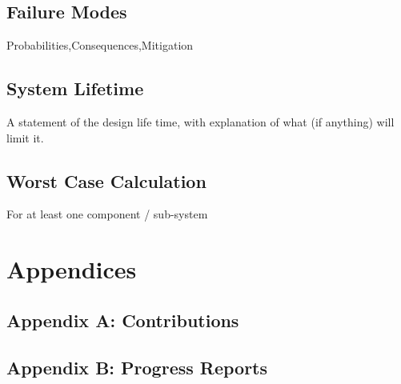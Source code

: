 \subsection{Failure Modes}
Probabilities,Consequences,Mitigation
\subsection{System Lifetime}
A statement of the design life time, with explanation of what (if anything) will limit it.
\subsection{Worst Case Calculation}
For at least one component / sub-system 



\newpage





\newpage
\section*{Appendices}
\subsection*{Appendix A: Contributions}
\subsection*{Appendix B: Progress Reports}





